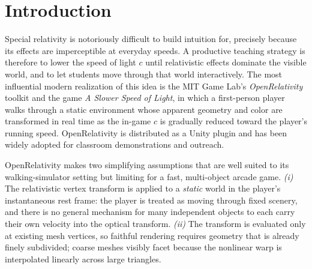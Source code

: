 \documentclass[aip,amsmath,amssymb,reprint,nofootinbib]{revtex4-2}
\begin{document}
\section{Introduction}

Special relativity is notoriously difficult to build intuition for, precisely
because its effects are imperceptible at everyday speeds. A productive teaching
strategy is therefore to lower the speed of light $c$ until relativistic effects
dominate the visible world, and to let students move through that world
interactively.\cite{Savage2007,Kraus2008} The most influential modern
realization of this idea is the MIT Game Lab's \emph{OpenRelativity}
toolkit\cite{Sherin2016} and the game \emph{A Slower Speed of Light}, in which a
first-person player walks through a static environment whose apparent geometry
and color are transformed in real time as the in-game $c$ is gradually reduced
toward the player's running speed. OpenRelativity is distributed as a Unity
plugin\cite{OpenRelativityRepo} and has been widely adopted for classroom
demonstrations and outreach.

OpenRelativity makes two simplifying assumptions that are well suited to its
walking-simulator setting but limiting for a fast, multi-object arcade game.
\emph{(i)} The relativistic vertex transform is applied to a \emph{static} world
in the player's instantaneous rest frame: the player is treated as moving
through fixed scenery, and there is no general mechanism for many independent
objects to each carry their own velocity into the optical transform. \emph{(ii)}
The transform is evaluated only at existing mesh vertices, so faithful rendering
requires geometry that is already finely subdivided; coarse meshes visibly
facet because the nonlinear warp is interpolated linearly across large
triangles.
\end{document}
